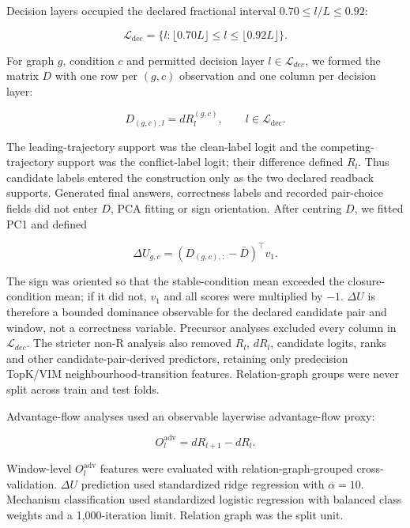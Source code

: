 \documentclass[11pt]{article}
\begin{document}
Decision layers occupied the declared fractional interval \(0.70\leq l/L\leq0.92\):

\begin{equation*}
\mathcal{L}_{\mathrm{dec}}=\{l:\lfloor0.70L\rfloor\leq l\leq\lfloor0.92L\rfloor\}.
\end{equation*}

For graph \(g\), condition \(c\) and permitted decision layer \(l\in\mathcal{L}_{dec}\), we formed the matrix \(D\) with one row per \((g,c)\) observation and one column per decision layer:

\begin{equation*}
D_{(g,c),l}=dR_l^{(g,c)},\qquad l\in\mathcal{L}_{\mathrm{dec}}.
\end{equation*}

The leading-trajectory support was the clean-label logit and the competing-trajectory support was the conflict-label logit; their difference defined \(R_l\). Thus candidate labels entered the construction only as the two declared readback supports. Generated final answers, correctness labels and recorded pair-choice fields did not enter \(D\), PCA fitting or sign orientation. After centring \(D\), we fitted PC1 and defined

\begin{equation*}
\Delta U_{g,c}=\left(D_{(g,c),:}-\bar D\right)^{\!\top}v_1.
\end{equation*}

The sign was oriented so that the stable-condition mean exceeded the closure-condition mean; if it did not, \(v_1\) and all scores were multiplied by \(-1\). \(\Delta U\) is therefore a bounded dominance observable for the declared candidate pair and window, not a correctness variable. Precursor analyses excluded every column in \(\mathcal{L}_{dec}\). The stricter non-R analysis also removed \(R_l\), \(dR_l\), candidate logits, ranks and other candidate-pair-derived predictors, retaining only predecision TopK/VIM neighbourhood-transition features. Relation-graph groups were never split across train and test folds.

Advantage-flow analyses used an observable layerwise advantage-flow proxy:

\begin{equation*}
O_l^{\mathrm{adv}}=dR_{l+1}-dR_l.
\end{equation*}

Window-level \(O_l^{\mathrm{adv}}\) features were evaluated with relation-graph-grouped cross-validation. \(\Delta U\) prediction used standardized ridge regression with \(\alpha=10\). Mechanism classification used standardized logistic regression with balanced class weights and a 1,000-iteration limit. Relation graph was the split unit.
\end{document}

